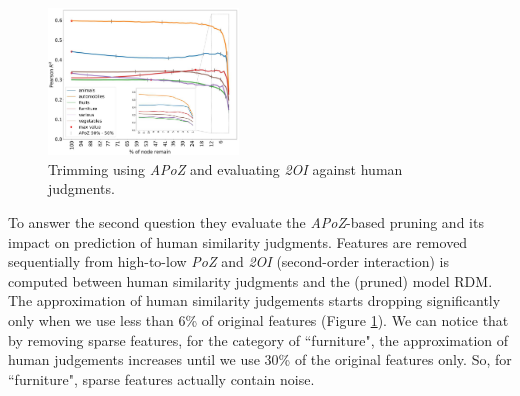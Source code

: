 \begin{figure}
  \centering
  \includegraphics[width=0.45\textwidth]{images/apoz_4.png}
  \caption{Trimming using \textit{APoZ} and evaluating \textit{2OI} against human judgments.}
  \label{fig:apoz_4}
\end{figure}

To answer the second question they evaluate the \textit{APoZ}-based pruning and its impact on prediction of human similarity judgments. Features are removed sequentially from high-to-low \textit{PoZ} and \textit{2OI} (second-order interaction) is computed between human similarity judgments and the (pruned) model RDM.
The approximation of human similarity judgements starts dropping significantly only when we use less than 6\% of original features (Figure \ref{fig:apoz_4}).
We can notice that by removing sparse features, for the category of ``furniture", the approximation of human judgements increases until we use 30\% of the original features only. So, for ``furniture", sparse features actually contain noise.


